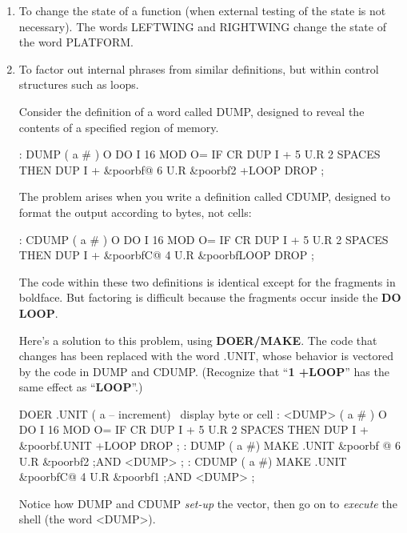 \begin{enumerate}
\item To change the state of a function (when external testing of the state is not
necessary). The words LEFTWING and RIGHTWING change the state of
the word PLATFORM.

\item To factor out internal phrases from similar definitions, but within control
structures such as loops.

Consider the definition of a word called DUMP, designed to reveal the
contents of a specified region of memory.


\begin{Code}[commandchars=\&\{\}]
: DUMP  ( a # )
   O DO  I 16 MOD O= IF  CR  DUP I +  5 U.R  2 SPACES  THEN
   DUP I +  &poorbf{@ 6} U.R  &poorbf{2 +LOOP}  DROP ;
\end{Code}
The problem arises when you write a definition called CDUMP, designed to
format the output according to bytes, not cells:

\begin{Code}[commandchars=\&\{\}]
: CDUMP  ( a # )
   O DO  I 16 MOD O= IF  CR  DUP I +  5 U.R  2 SPACES  THEN
   DUP I +  &poorbf{C@  4} U.R  &poorbf{LOOP} DROP ;
\end{Code}

The code within these two definitions is identical except for the fragments
in boldface. But factoring is difficult because the fragments occur inside the
\textbf{DO LOOP}.

Here's a solution to this problem, using \textbf{DOER/MAKE}. The code that
changes has been replaced with the word .UNIT, whose behavior is vectored
by the code in DUMP and CDUMP. (Recognize that ``\textbf{1 +LOOP}'' has
the same effect as ``\textbf{LOOP}''.)

\begin{Code}[commandchars=\&\{\}]
DOER .UNIT ( a -- increment)  \ display byte or cell
: <DUMP>  ( a # )
   O DO  I 16 MOD O= IF  CR  DUP I +  5 U.R  2 SPACES  THEN
   DUP I + &poorbf{.UNIT}  +LOOP  DROP ;
: DUMP   ( a #)  MAKE .UNIT &poorbf{ @  6} U.R  &poorbf{2} ;AND <DUMP> ;
: CDUMP ( a #)   MAKE .UNIT &poorbf{C@  4} U.R  &poorbf{1} ;AND <DUMP> ;
\end{Code}
Notice how DUMP and CDUMP \emph{set-up} the vector, then go on to
\emph{execute} the shell (the word <DUMP>).


\end{enumerate}

